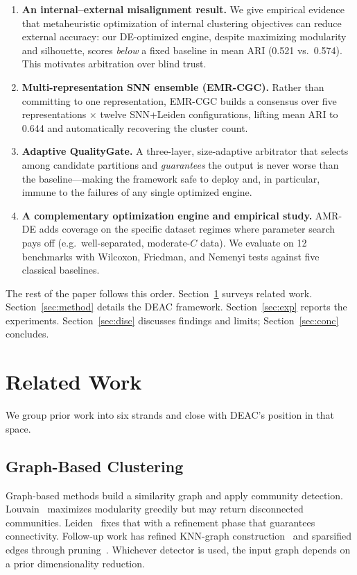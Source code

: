 \documentclass[conference]{IEEEtran}
\begin{document}
\begin{enumerate}
\item \textbf{An internal--external misalignment result.} We give empirical
evidence that metaheuristic optimization of internal clustering objectives
can reduce external accuracy: our DE-optimized engine, despite maximizing
modularity and silhouette, scores \emph{below} a fixed baseline in mean ARI
(0.521 vs.\ 0.574). This motivates arbitration over blind trust.

\item \textbf{Multi-representation SNN ensemble (EMR-CGC).} Rather than
committing to one representation, EMR-CGC builds a consensus over five
representations $\times$ twelve SNN+Leiden configurations, lifting mean ARI
to 0.644 and automatically recovering the cluster count.

\item \textbf{Adaptive QualityGate.} A three-layer, size-adaptive arbitrator
that selects among candidate partitions and \emph{guarantees} the output is
never worse than the baseline---making the framework safe to deploy and, in
particular, immune to the failures of any single optimized engine.

\item \textbf{A complementary optimization engine and empirical study.}
AMR-DE adds coverage on the specific dataset regimes where parameter search
pays off (e.g.\ well-separated, moderate-$C$ data). We evaluate on 12
benchmarks with Wilcoxon, Friedman, and Nemenyi tests against five classical
baselines.
\end{enumerate}

The rest of the paper follows this order. Section~\ref{sec:related} surveys related work. Section~\ref{sec:method} details the DEAC framework. Section~\ref{sec:exp} reports the experiments. Section~\ref{sec:disc} discusses findings and limits; Section~\ref{sec:conc} concludes.

\section{Related Work}\label{sec:related}

We group prior work into six strands and close with DEAC's position in that space.

\subsection{Graph-Based Clustering}
Graph-based methods build a similarity graph and apply community detection. Louvain~\cite{blondel2008fast} maximizes modularity greedily but may return disconnected communities. Leiden~\cite{traag2019louvain} fixes that with a refinement phase that guarantees connectivity. Follow-up work has refined KNN-graph construction~\cite{brito1997connectivity} and sparsified edges through pruning~\cite{satuluri2011local}. Whichever detector is used, the input graph depends on a prior dimensionality reduction.
\end{document}
